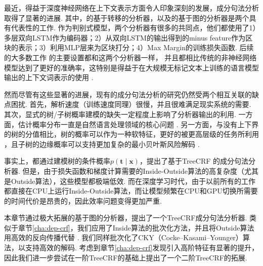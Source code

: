 最近，得益于深度神经网络在上下文表示方面令人印象深刻的发展，成分句法分析取得了显著的进展.
其中，\citet{cross-huang-2016-span}的基于转移的分析器，以及\citet{stern-etal-2017-minimal}的基于图的分析器是两个具有代表性的工作.
作为判别式模型，两个分析器有很多的共同点，他们都使用了1）多层双向LSTM作为编码器；2）从双向LSTM的输出得到的minus feature作为区块的表示；3）利用MLP层来为区块打分；4）Max Margin的训练损失函数.
后续的大多数工作 \citep{gaddy-etal-2018-whats,kitaev-klein-2018-constituency}的主要设置都和这两个分析器一样， 并且都相比传统的非神经网络模型达到了更好的准确率，这特别是得益于在大规模无标记文本上训练的语言模型输出的上下文词表示的使用 \citep{peters-etal-2018-deep,devlin-etal-2019-bert}.

然而尽管有这些显著的进展，现有的成分句法分析的研究仍然受两个相互关联的缺点困扰.
首先，解析速度（训练速度同理）很慢，并且很难满足现实系统的需要.
其次，显式的树/子树概率建模的缺失一定程度上影响了分析器输出的利用.
一方面，估计概率分布一直是自然语言处理领域的核心问题 \citep{le-zuidema-2014-inside}.
另一方面，与没有上下界的树的分值相比，树的概率可以作为一种软特征，更好的被更高层级的任务所利用 \citep{jin-etal-2020-relation}，且子树的边缘概率可以支持更加复杂的最小贝叶斯风险解码 \citep{smith-smith-2007-probabilistic}.

事实上，\citet{finkel-etal-2008-efficient,durrett-klein-2015-neural}都通过建模树的条件概率$p(\boldsymbol{t}\mid\boldsymbol{x})$，提出了基于TreeCRF \citep{lafferty-etal-2001-crf}的成分句法分析器.
但是，由于损失函数和梯度计算需要的Inside-Outside算法的高复杂度（尤其是Outside算法），这些模型都极端低效.
而在深度学习时代，由于以前所有的工作都直接在CPU上运行Inside-Outside算法，而让模型频繁在CPU和GPU切换所需要的时间代价是昂贵的，因此效率问题变得更加严重.

本章节通过极大拓展\citet{stern-etal-2017-minimal}的基于图的分析器，提出了一个TreeCRF成分句法分析器.
类似于章节\ref{cha:dep-crf}，我们应用了Inside算法的批次化方法，并且将Outside算法用高效的反向传播代替 \citep{eisner-2016-inside}.
我们同样批次化了CKY（Cocke–Kasami–Younger）算法，以支持高效的解码.
考虑到章节\ref{cha:dep-crf}发现引入高阶特征有显著的提升，因此我们进一步尝试在一阶TreeCRF的基础上提出了一个二阶TreeCRF的拓展.

